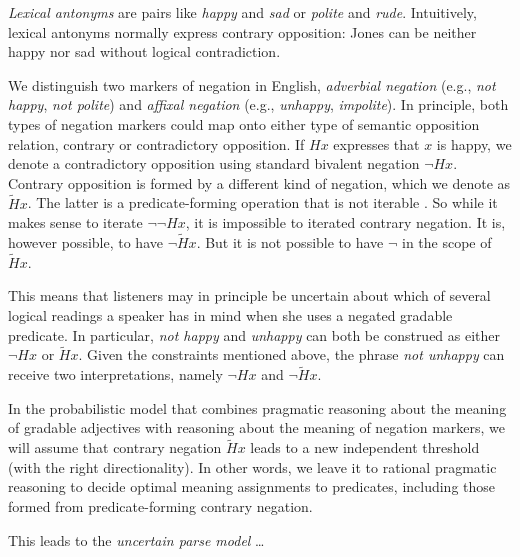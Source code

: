 \documentclass[fleqn,reqno,10pt]{article}
\begin{document}
\emph{Lexical antonyms} are pairs like \emph{happy} and \emph{sad} or \emph{polite} and
\emph{rude}. Intuitively, lexical antonyms normally express contrary opposition: Jones can be
neither happy nor sad without logical contradiction.

We distinguish two markers of negation in English, \emph{adverbial negation} (e.g., \emph{not
  happy}, \emph{not polite}) and \emph{affixal negation} (e.g., \emph{unhappy},
\emph{impolite}). In principle, both types of negation markers could map onto either type of
semantic opposition relation, contrary or contradictory opposition. If $Hx$ expresses that $x$
is happy, we denote a contradictory opposition using standard bivalent negation $\neg
Hx$.
Contrary opposition is formed by a different kind of negation, which we denote as
$\tilde{H}x$. The latter is a predicate-forming operation that is not iterable
\citep{Horn1989:A-Natural-Histo,sep-negation}. So while it makes sense to iterate $\neg \neg
Hx$, it is impossible to iterated contrary negation. It is, however possible, to have $\neg
\tilde{H}x$. But it is not possible to have $\neg$ in the scope of $\tilde{H}x$. 

This means that listeners may in principle be uncertain about which of several logical readings
a speaker has in mind when she uses a negated gradable predicate. In particular, \emph{not
  happy} and \emph{unhappy} can both be construed as either $\neg Hx$ or $\tilde{H}x$. Given
the constraints mentioned above, the phrase \emph{not unhappy} can receive two interpretations,
namely $\neg Hx$ and $\neg \tilde{H}x$. 

In the probabilistic model that combines pragmatic reasoning about the meaning of gradable
adjectives with reasoning about the meaning of negation markers, we will assume that contrary
negation $\tilde{H}x$ leads to a new independent threshold (with the right directionality). In
other words, we leave it to rational pragmatic reasoning to decide optimal meaning assignments
to predicates, including those formed from predicate-forming contrary negation. 

This leads to the \emph{uncertain parse model} \dots




\printbibliography[heading=bibintoc]
\end{document}
